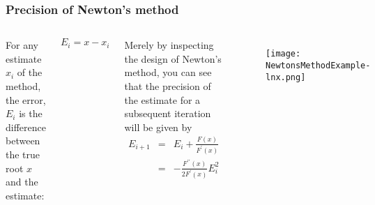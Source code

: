 \documentclass[hyperref={colorlinks=true}]{beamer}
\begin{document}

\begin{frame}%
  \frametitle{Precision of Newton's method}

  \begin{columns}
  
   
      For any estimate $x_i$ of the method, the error, $E_i$ is the difference between the true root $x$ and the estimate:
      
      \begin{equation}
        E_i = x - x_i
      \end{equation}
   
      Merely by inspecting the design of Newton's method, you can see that the precision of the estimate for a subsequent iteration will be given by
      \begin{eqnarray}
        E_{i+1} &=& E_i + \frac{F(x)}{F^{\prime}(x)} \\
                &=& -\frac{F^{\prime\prime}(x)}{2F^{\prime}(x)}E_i^2
      \end{eqnarray}
   
    
      \begin{figure}
        \centering
        \texttt{[image: NewtonsMethodExample-lnx.png]}
      \end{figure}
    
  \end{columns}

\end{frame}

\end{document}
